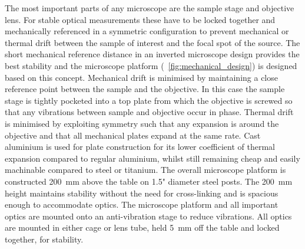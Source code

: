 \documentclass{article}
\begin{document}
The most important parts of any microscope are the sample stage and objective lens. For stable optical measurements these have to be locked together and mechanically referenced in a symmetric configuration to prevent mechanical or thermal drift between the sample of interest and the focal spot of the source. The short mechanical reference distance in an inverted microscope design provides the best stability and the microscope platform (\figurename~\ref{fig:mechanical_design}) is designed based on this concept.
Mechanical drift is minimised by maintaining a close reference point between the sample and the objective. In this case the sample stage is tightly pocketed into a top plate from which the objective is screwed so that any vibrations between sample and objective occur in phase.
Thermal drift is minimised by exploiting symmetry such that any expansion is around the objective and that all mechanical plates expand at the same rate. Cast aluminium is used for plate construction for its lower coefficient of thermal expansion compared to regular aluminium, whilst still remaining cheap and easily machinable compared to steel or titanium.
The overall microscope platform is constructed \SI{200}{mm} above the table on 1.5" diameter steel posts. The \SI{200}{mm} height maintains stability without the need for cross-linking and is spacious enough to accommodate optics. The microscope platform and all important optics are mounted onto an anti-vibration stage to reduce vibrations. All optics are mounted in either cage or lens tube, held \SI{5}{mm} off the table and locked together, for stability.
\end{document}

